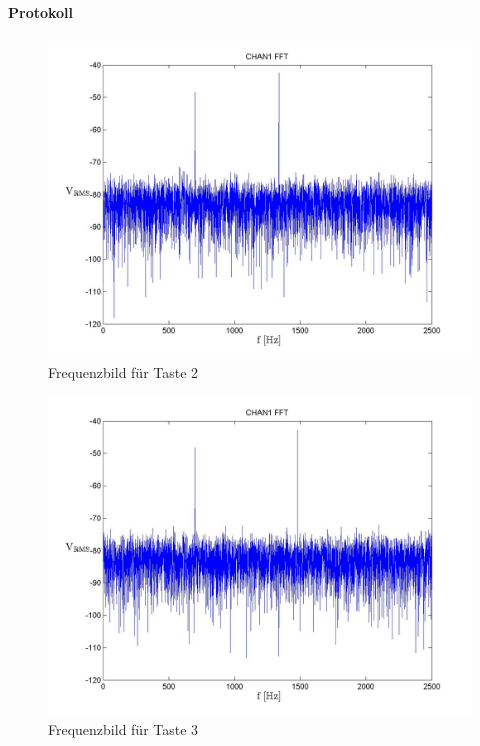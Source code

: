 \documentclass[10pt]{scrreprt}
\begin{document}
        \paragraph{Protokoll}
        \begin{center}
            \begin{figure}[H]
                \includegraphics[width=\textwidth]{Screenshot_GUI_431_T2_chan1_fft.jpg}
                \caption{Frequenzbild für Taste 2}
            \end{figure}
            \begin{figure}[H]
                \includegraphics[width=\textwidth]{Screenshot_GUI_431_T3_chan1_fft.jpg}
                \caption{Frequenzbild für Taste 3}

\end{figure}
\end{center}
\end{document}
